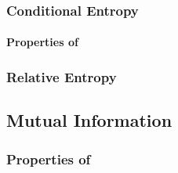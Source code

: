 \subsubsection{Conditional Entropy}\label{subsubsec:Conditional_Entropy}
\paragraph{Properties of }\label{par:Conditional_Entropy_Properties}

\subsubsection{Relative Entropy}\label{subsubsec:Relative_Entropy}

\subsection{Mutual Information}\label{subsec:Mutual_Information}
\subsubsection{Properties of }\label{subsubsec:Mutual_Information_Properties}
